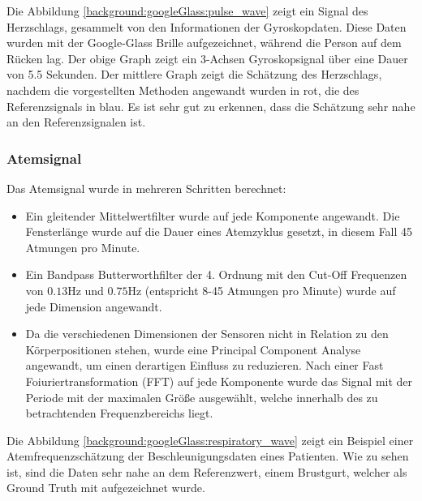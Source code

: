 Die Abbildung \ref{background:googleGlass:pulse_wave} zeigt ein Signal des Herzschlags, gesammelt von den Informationen der Gyroskopdaten. Diese Daten wurden mit der Google-Glass Brille aufgezeichnet, während die Person auf dem Rücken lag. Der obige Graph zeigt ein 3-Achsen Gyroskopsignal über eine Dauer von 5.5 Sekunden. Der mittlere Graph zeigt die Schätzung des Herzschlags, nachdem die vorgestellten Methoden angewandt wurden in rot, die des Referenzsignals in blau. Es ist sehr gut zu erkennen, dass die Schätzung sehr nahe an den Referenzsignalen ist.

\newpage

\subsubsection{Atemsignal}
Das Atemsignal wurde in mehreren Schritten berechnet:
\begin{itemize}
    \item Ein gleitender Mittelwertfilter wurde auf jede Komponente angewandt. Die Fensterlänge wurde auf die Dauer eines Atemzyklus gesetzt, in diesem Fall 45 Atmungen pro Minute. 
    \item Ein Bandpass Butterworthfilter der 4. Ordnung mit den Cut-Off Frequenzen von $0.13 \si{\hertz}$ und $0.75 \si{\hertz}$ (entspricht 8-45 Atmungen pro Minute) wurde auf jede Dimension angewandt.
    \item Da die verschiedenen Dimensionen der Sensoren nicht in Relation zu den Körperpositionen stehen, wurde eine Principal Component Analyse angewandt, um einen derartigen Einfluss zu reduzieren. Nach einer Fast Foiuriertransformation (FFT) auf jede Komponente wurde das Signal mit der Periode mit der maximalen Größe ausgewählt, welche innerhalb des zu betrachtenden Frequenzbereichs liegt.
\end{itemize}

Die Abbildung \ref{background:googleGlass:respiratory_wave} zeigt ein Beispiel einer Atemfrequenzschätzung der Beschleunigungsdaten eines Patienten. Wie zu sehen ist, sind die Daten sehr nahe an dem Referenzwert, einem Brustgurt, welcher als Ground Truth mit aufgezeichnet wurde.


